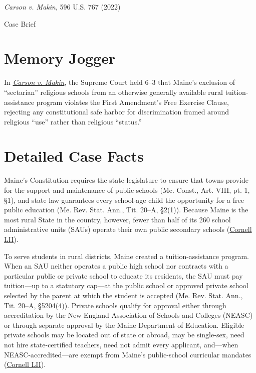 \documentclass[12pt]{article}
\begin{document}
\begin{center}
{\LARGE \textit{Carson v. Makin}, 596 U.S. 767 (2022)\par}
\vspace{0.8em}
{\large Case Brief\par}
\end{center}
\vspace{1em}

\section{Memory Jogger}

In \href{https://www.courtlistener.com/opinion/6479298/carson-v-makin/}{\textit{Carson v. Makin}}, the Supreme Court held 6--3 that Maine's exclusion of ``sectarian'' religious schools from an otherwise generally available rural tuition-assistance program violates the First Amendment's Free Exercise Clause, rejecting any constitutional safe harbor for discrimination framed around religious ``use'' rather than religious ``status.''

\section{Detailed Case Facts}

Maine's Constitution requires the state legislature to ensure that towns provide for the support and maintenance of public schools (Me. Const., Art. VIII, pt. 1, \S 1), and state law guarantees every school-age child the opportunity for a free public education (Me. Rev. Stat. Ann., Tit. 20--A, \S 2(1)). Because Maine is the most rural State in the country, however, fewer than half of its 260 school administrative units (SAUs) operate their own public secondary schools (\href{https://www.law.cornell.edu/supremecourt/text/20-1088}{Cornell LII}).

To serve students in rural districts, Maine created a tuition-assistance program. When an SAU neither operates a public high school nor contracts with a particular public or private school to educate its residents, the SAU must pay tuition---up to a statutory cap---at the public school or approved private school selected by the parent at which the student is accepted (Me. Rev. Stat. Ann., Tit. 20--A, \S 5204(4)). Private schools qualify for approval either through accreditation by the New England Association of Schools and Colleges (NEASC) or through separate approval by the Maine Department of Education. Eligible private schools may be located out of state or abroad, may be single-sex, need not hire state-certified teachers, need not admit every applicant, and---when NEASC-accredited---are exempt from Maine's public-school curricular mandates (\href{https://www.law.cornell.edu/supremecourt/text/20-1088}{Cornell LII}).
\end{document}
